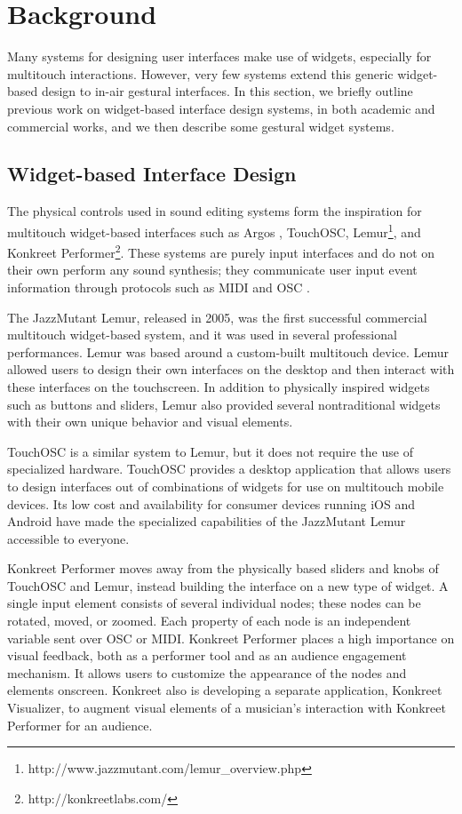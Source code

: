 \documentclass{nime-alternate}
\begin{document}
\section{Background}
Many systems for designing user interfaces make use of widgets, especially for multitouch interactions. However, very few systems
extend this generic widget-based design to in-air gestural interfaces. In this section, we briefly outline previous work on widget-based
interface design systems, in both academic and commercial works, and we then describe some gestural widget systems.
\subsection{Widget-based Interface Design}
The physical controls used in sound editing systems form the inspiration for multitouch
widget-based interfaces such as Argos \cite{diakopoulos2010argos}, TouchOSC, 
Lemur\footnote{http://www.jazzmutant.com/lemur\_overview.php}, and Konkreet Performer\footnote{http://konkreetlabs.com/}. These systems are purely
input interfaces and do not on their own perform any sound synthesis; they communicate user input event information through
protocols such as MIDI and OSC \cite{osc}.

The JazzMutant Lemur, released in 2005, was the
first successful commercial multitouch widget-based system, and it was used in several professional performances. 
Lemur was based around
a custom-built multitouch device. Lemur allowed users to design their own interfaces
on the desktop and then interact with these interfaces on the touchscreen. In
addition to physically inspired widgets such as buttons and sliders, Lemur also provided
several nontraditional widgets with their own unique behavior and visual elements. 

TouchOSC is a similar system to Lemur, but it does not require the use of specialized hardware.
TouchOSC provides a desktop
application that allows users to design interfaces out of combinations of widgets for use on
multitouch mobile devices. Its low cost and availability for consumer devices running iOS and Android have
made the specialized capabilities of the JazzMutant Lemur accessible to everyone.

Konkreet Performer moves away from the physically based sliders and knobs of TouchOSC and 
Lemur, instead building the interface on a new type of widget. A single input element consists of several
individual nodes; these nodes can be rotated, moved, or zoomed. Each property of each node is an independent variable sent over OSC or MIDI. Konkreet Performer places a high importance on visual feedback, both
as a performer tool and as an audience engagement mechanism. It allows users to 
customize the appearance of the nodes and elements onscreen. Konkreet also is developing a 
separate application, Konkreet Visualizer, to augment visual elements of a musician's interaction with Konkreet Performer for an audience.
\end{document}
